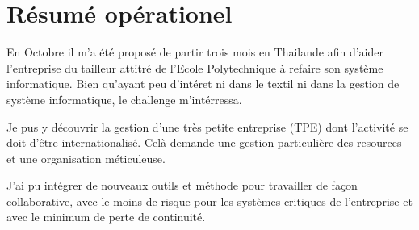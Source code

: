 \chapter{Résumé opérationel}
En Octobre il m'a été proposé de partir trois mois en Thailande afin d'aider l'entreprise du tailleur attitré de l'Ecole Polytechnique à refaire son système informatique. Bien qu'ayant peu d'intéret ni dans le textil ni dans la gestion de système informatique, le challenge m'intérressa.


Je pus y découvrir la gestion d'une très petite entreprise (TPE) dont l'activité se doit d'être internationalisé. Celà demande une gestion particulière des resources et une organisation méticuleuse.


J'ai pu intégrer de nouveaux outils et méthode pour travailler de façon collaborative, avec le moins de risque pour les systèmes critiques de l'entreprise et avec le minimum de perte de continuité.
